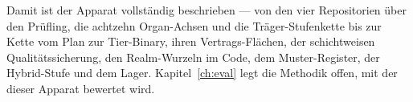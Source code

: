 Damit ist der Apparat vollständig beschrieben --- von den vier Repositorien über den Prüfling, die
achtzehn Organ-Achsen und die Träger-Stufenkette bis zur Kette vom Plan zur Tier-Binary, ihren
Vertrags-Flächen, der schichtweisen Qualitätssicherung, den Realm-Wurzeln im Code, dem Muster-Register,
der Hybrid-Stufe und dem Lager. Kapitel~\ref{ch:eval} legt die Methodik offen, mit der dieser Apparat
bewertet wird.
